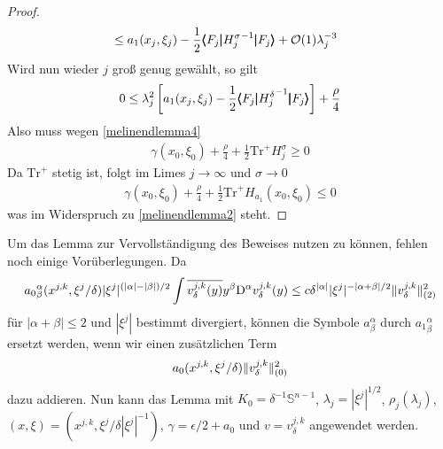 \begin{proof}
\begin{align}
&\le a_1(x_j,\xi_j) - \frac 1 2\pmb\langle F_j\pmb|{H_j^\sigma}^{-1}\pmb|F_j\pmb\rangle  + \mathcal O(1)\lambda_j^{-3}
\end{align}
Wird nun wieder $j$ groß genug gewählt, so gilt
\begin{align}
0\le \lambda_j^2\left[ a_1(x_j,\xi_j) - \frac{1}{2}\pmb\langle F_j\pmb|{H_j^\delta}^{-1}\pmb|F_j\pmb\rangle \right]  +\frac\rho 4
\end{align}
Also muss wegen \eqref{melinendlemma4}
\begin{align}
\gamma(x_0,\xi_0) + \frac \rho 4 + \frac 1 2 \mathrm{Tr}^+ H_j^\sigma\ge 0
\end{align}
Da $\mathrm{Tr}^+$ stetig ist, folgt im Limes $j\to\infty$ und $\sigma\to 0$
\begin{align}
\gamma(x_0,\xi_0) + \frac \rho 4 + \frac 1 2 \mathrm{Tr}^+ H_{a_1}(x_0,\xi_0)\le 0
\end{align}
was im Widerspruch zu \eqref{melinendlemma2} steht.
\end{proof}

Um das Lemma zur Vervollständigung des Beweises nutzen zu können, fehlen noch einige Vorüberlegungen. Da
\begin{align}
{a_0}^\alpha_\beta(x^{j,k},\xi^j/\delta)|\xi^j|^{(|\alpha|-|\beta|)/2}\int \overline{v^{j,k}_\delta(y)}y^\beta\mathrm D^\alpha v^{j,k}_\delta(y) \le c \delta^{\lvert\alpha\rvert}|\xi^j|^{-|\alpha+\beta|/2}\lVert v^{j,k}_\delta\rVert_{(2)}^2
\end{align}
für $|\alpha+\beta|\le 2$ und $|\xi^j|$ bestimmt divergiert, können die Symbole $a^\alpha_\beta$ durch ${a_1}^\alpha_\beta$ ersetzt werden, wenn wir einen zusätzlichen Term
\begin{align}
{a_0}(x^{j,k},\xi^j/\delta)\lVert v^{j,k}_\delta\rVert_{(0)}^2
\end{align}
dazu addieren. Nun kann das Lemma mit $K_0=\delta^{-1}\mathbb{S}^{n-1}$, $\lambda_j=|\xi^j|^{1/2}$, $\rho_j(\lambda_j)$, $(x,\xi)=(x^{j,k},\xi^j/\delta|\xi^j|^{-1})$, $\gamma = \epsilon/2 + a_0$ und $v=v^{j,k}_\delta$ angewendet werden.

